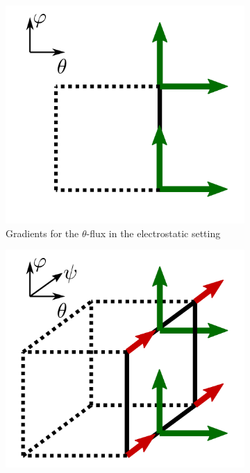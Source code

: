 \begin{figure}[!h]\centering
	\begin{subfigure}[t]{0.32\textwidth}
		\centering
		\includegraphics[width=\textwidth]{schemes/Gunter2D.png}
		\caption{ Gradients for the $\theta$-flux in the electrostatic setting }
		\label{fig:Gunter2D} 
	\end{subfigure}
	\begin{subfigure}[t]{0.32\textwidth}
		\centering
		\includegraphics[width=\textwidth]{schemes/Gunter3D_theta.png}

\end{subfigure}
\end{figure}
